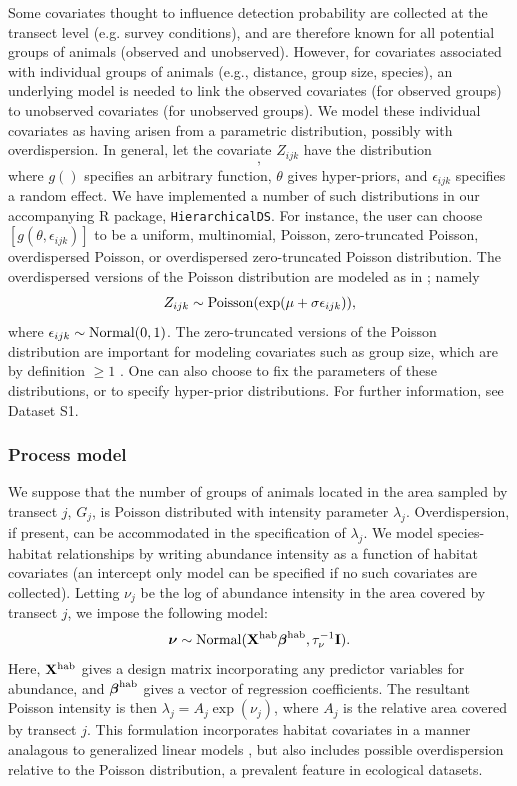 \documentclass[10pt]{article}
\begin{document}
Some covariates thought to influence detection probability are collected at the transect level (e.g. survey conditions), and are therefore known for all potential groups of animals (observed and unobserved).  However, for covariates associated with individual groups of animals (e.g., distance, group size, species), an underlying model is needed to link the observed covariates (for observed groups) to unobserved covariates (for unobserved groups).  We model these individual covariates as having arisen from a parametric distribution, possibly with overdispersion.  In general, let the covariate $Z_{ijk}$ have the distribution
\begin{equation}
[g(\theta,\epsilon_{ijk})],
\label{eq:cov.dist}
\end{equation}
where $g()$ specifies an arbitrary function, $\theta$ gives hyper-priors, and $\epsilon_{ijk}$ specifies a random effect.  We have implemented a number of such distributions in our accompanying R package, {\tt HierarchicalDS}.  For instance, the user can choose $[g(\theta,\epsilon_{ijk})]$ to be a uniform, multinomial, Poisson, zero-truncated Poisson, overdispersed Poisson, or overdispersed zero-truncated Poisson distribution.  The overdispersed versions of the Poisson distribution are modeled as in \cite{McClintockEtAl2009}; namely
$$
Z_{ijk} \sim {\rm Poisson}(\exp(\mu+\sigma \epsilon_{ijk})),
$$
where $\epsilon_{ijk} \sim {\rm Normal}(0,1)$.
The zero-truncated versions of the Poisson distribution are important for modeling covariates such as group size, which are by definition $\ge 1$ \cite{Royle2008}.
One can also choose to fix the parameters of these distributions, or to specify hyper-prior distributions.  For further information, see Dataset S1.

\subsubsection*{Process model}

We suppose that the number of groups of animals located in the area sampled by transect $j$, $G_j$, is Poisson distributed with intensity parameter $\lambda_j$.  Overdispersion, if present, can be accommodated in the specification of $\lambda_j$.
We model species-habitat relationships by writing abundance intensity as a function of habitat covariates (an intercept only model can be specified if no such covariates are collected).  Letting $\nu_j$ be the log of abundance intensity in the area covered by transect $j$, we impose the following model:
$$
 \boldsymbol{\nu} \sim {\rm Normal}({\bf X}^{\rm hab}
 \boldsymbol{\beta}^{\rm hab},\tau_\nu^{-1}{\bf I}).
$$
Here, ${\bf X}^{\rm hab}$ gives a design matrix incorporating any predictor variables for abundance, and $\boldsymbol{\beta}^{\rm hab}$ gives a vector of regression coefficients.
The resultant Poisson intensity is then $\lambda_j=A_j \exp(\nu_j)$, where $A_j$ is the relative area covered by transect $j$.  This formulation incorporates habitat covariates in a manner analagous to generalized linear models \cite{McCullaghNelder1989}, but also includes possible overdispersion relative to the Poisson distribution, a prevalent feature in ecological datasets.
\end{document}
